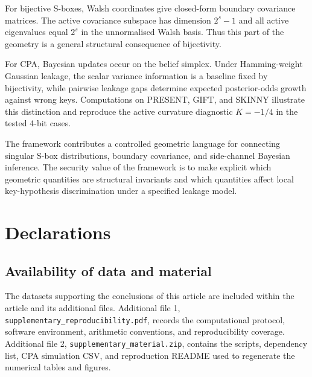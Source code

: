 \documentclass[referee,lineno,pdflatex,sn-mathphys-num]{sn-jnl}
\theoremstyle{thmstylethree}
\theoremstyle{thmstyletwo}
\theoremstyle{thmstyleone}
\begin{document}
For bijective S-boxes, Walsh coordinates give closed-form boundary covariance
matrices.  The active covariance subspace has dimension $2^s-1$ and all active
eigenvalues equal $2^s$ in the unnormalised Walsh basis.  Thus this part of the
geometry is a general structural consequence of bijectivity.

For CPA, Bayesian updates occur on the belief simplex.  Under Hamming-weight
Gaussian leakage, the scalar variance information is a baseline fixed by
bijectivity, while pairwise leakage gaps determine expected posterior-odds
growth against wrong keys.  Computations on PRESENT, GIFT, and SKINNY
illustrate this distinction and reproduce the active curvature diagnostic
$K=-1/4$ in the tested 4-bit cases.

The framework contributes a controlled geometric language for connecting
singular S-box distributions, boundary covariance, and side-channel Bayesian
inference.
The security value of the framework is to make explicit which geometric
quantities are structural invariants and which quantities affect local
key-hypothesis discrimination under a specified leakage model.

\section*{Declarations}

\subsection*{Availability of data and material}

The datasets supporting the conclusions of this article are included within the
article and its additional files. Additional file 1,
\texttt{supplementary\_reproducibility.pdf}, records the computational
protocol, software environment, arithmetic conventions, and reproducibility
coverage. Additional file 2, \texttt{supplementary\_material.zip}, contains
the scripts, dependency list, CPA simulation CSV, and reproduction README used
to regenerate the numerical tables and figures.
\end{document}
